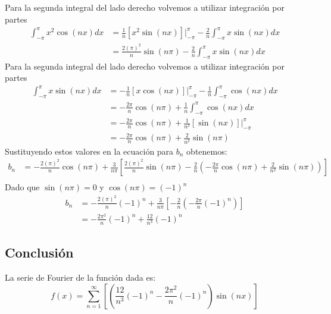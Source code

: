         Para la segunda integral del lado derecho volvemos a utilizar integración por partes
        \begin{align*}
            \int_{-\pi}^{\pi} x^2 \cos(nx) dx & = \frac{1}{n} [x^2 \sin(nx)]|_{-\pi}^{\pi} - \frac{2}{n} \int_{-\pi}^{\pi} x \sin(nx) dx \\
            & = \frac{2 (\pi)^2}{n} \sin(n\pi) - \frac{2}{n} \int_{-\pi}^{\pi} x \sin(nx) dx
        \end{align*}
        Para la segunda integral del lado derecho volvemos a utilizar integración por partes
        \begin{align*}
            \int_{-\pi}^{\pi} x \sin(nx) dx & = - \frac{1}{n} [x \cos(nx)]|_{-\pi}^{\pi} - \frac{1}{n} \int_{-\pi}^{\pi} \cos(nx) dx \\
            & = -\frac{2 \pi}{n} \cos(n\pi) + \frac{1}{n} \int_{-\pi}^{\pi}\cos(nx) dx \\
            & = -\frac{2 \pi}{n} \cos(n\pi) + \frac{1}{n^2} [\sin(nx)]|_{-\pi}^{\pi} \\
            & = -\frac{2 \pi}{n} \cos(n\pi) + \frac{2}{n^2} \sin(n\pi)
        \end{align*}
        Sustituyendo estos valores en la ecuación para $b_n$ obtenemos:
        \begin{align*}
            b_n & = - \frac{2(\pi)^2}{n} \cos(n\pi) + \frac{3}{n \pi} \left[  \frac{2 (\pi)^2}{n} \sin(n\pi) - 
            \frac{2}{n} \left( -\frac{2 \pi}{n} \cos(n\pi) + \frac{2}{n^2} \sin(n\pi) \right) \right] \\
        \end{align*}
        Dado que $\sin(n\pi) = 0$ y $\cos(n\pi) = (-1)^n$
        \begin{align*}
            b_n & = - \frac{2(\pi)^2}{n} (-1)^n + \frac{3}{n \pi} \left[  - 
            \frac{2}{n} \left( -\frac{2 \pi}{n} (-1)^n \right) \right] \\
            & = - \frac{2 \pi^2}{n} (-1)^n + \frac{12}{n^3} (-1)^n
        \end{align*}

\subsection*{Conclusión}
    La serie de Fourier de la función dada es:
    \begin{equation*}
        \boxed{f(x) = \sum_{n = 1}^{\infty} \left[ \left(\frac{12}{n^3} (-1)^n - \frac{2 \pi^2}{n} (-1)^n \right) \sin(nx) \right]}
    \end{equation*}
